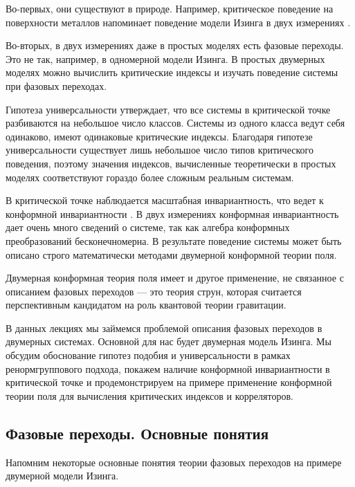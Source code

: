 \documentclass[a4paper,12pt]{article}
\theoremstyle{definition}
\theoremstyle{definition}
\theoremstyle{definition}
\begin{document}
Во-первых, они существуют в природе. Например, критическое поведение на поверхности металлов напоминает поведение модели Изинга в двух измерениях \cite{campuzano1985110}.

Во-вторых, в двух измерениях даже в простых моделях есть фазовые переходы. Это не так, например,  в одномерной модели Изинга. В простых двумерных моделях можно вычислить критические индексы и изучать поведение системы при фазовых переходах.

Гипотеза универсальности утверждает, что все системы в критической точке разбиваются на небольшое число классов. Системы из одного класса ведут себя одинаково, имеют одинаковые критические индексы. Благодаря гипотезе универсальности существует лишь небольшое число типов критического поведения, поэтому значения индексов, вычисленные теоретически в простых моделях соответствуют гораздо более сложным реальным системам.

В критической точке наблюдается масштабная инвариантность, что ведет к конформной инвариантности \cite{Polyakov:1970xd}. В двух измерениях конформная инвариантность дает очень много сведений о системе, так как алгебра конформных преобразований бесконечномерна. В результате поведение системы может быть описано строго математически методами двумерной конформной теории поля.

Двумерная конформная теория поля имеет и другое применение, не связанное с описанием фазовых переходов --- это теория струн, которая считается перспективным кандидатом на роль квантовой теории гравитации.

В данных лекциях мы займемся проблемой описания фазовых переходов в двумерных системах. Основной для нас будет двумерная модель Изинга. Мы обсудим обоснование гипотез подобия и универсальности в рамках ренормгруппового подхода, покажем наличие конформной инвариантности в критической точке и продемонстрируем на примере применение конформной теории поля для вычисления критических индексов и корреляторов. 

\subsection{Фазовые переходы. Основные понятия}
\label{sec:phase-transitions}

Напомним некоторые основные понятия теории фазовых переходов на примере двумерной модели Изинга.
\end{document}

